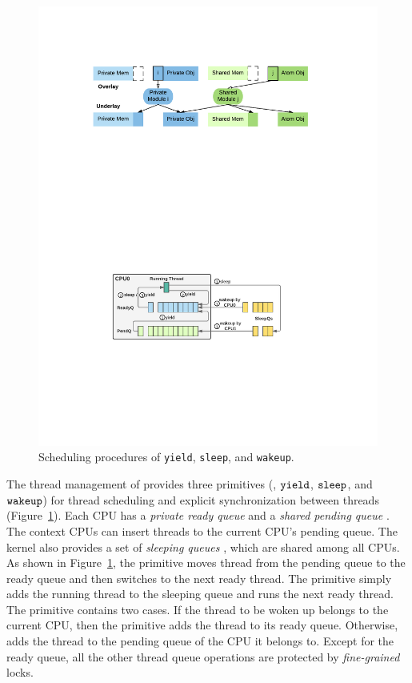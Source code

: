 {\begin{figure}[t]\centering
\includegraphics[scale=1]{figs/scheduler} 
\caption{Scheduling procedures of \texttt{yield}, \texttt{sleep},
and \texttt{wakeup}.}
\label{fig:exp:fig:scheduler}
\hrulefill
\end{figure}

The thread management of \cCTOS{}
provides three primitives
(\ie, ${\texttt{yield}}$, ${\texttt{sleep}}$, and ${\texttt{wakeup}}$)
for  thread scheduling and explicit synchronization between threads
(\cf Figure~\ref{fig:exp:fig:scheduler}). 
Each CPU has a \emph{private ready queue} 
and a \emph{shared pending queue} .
The context CPUs can insert threads to the current CPU's pending queue.
The {\cCTOS} kernel also provides a set of \emph{sleeping queues} , which are
shared among all CPUs.
As shown in Figure~\ref{fig:exp:fig:scheduler},
the  primitive moves thread from
the pending queue to the ready queue
and then switches to the next ready thread.
The  primitive simply adds the running thread to the sleeping
queue and runs the next ready thread.
The  primitive contains two cases.
If the thread to be woken up belongs to the current CPU,
then the primitive adds the thread to its ready queue.
Otherwise,  adds the thread to the pending queue of the CPU it belongs to.
Except for the ready queue,
all the other thread queue operations are protected by \emph{fine-grained} locks.


}
